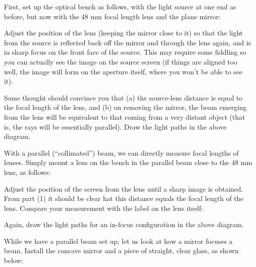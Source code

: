 \noindent First, set up the optical bench as follows, with the light
source at one end as before, but now with the 48 mm focal length lens
and the plane mirror:

\begin{figure*}[h]
\centerline{}
\caption{}
\end{figure*}

\noindent Adjust the position of the lens (keeping the mirror close to
it) so that the light from the source is reflected back off the mirror
and through the lens again, and is in sharp focus on the front face of
the source.  This may require some fiddling so you can actually see
the image on the source screen (if things are aligned too well, the
image will form on the aperture itself, where you won't be able to see
it).

\noindent Some thought should convince you that (a) the source-lens
distance is equal to the focal length of the lens, and (b) on removing
the mirror, the beam emerging from the lens will be equivalent to that
coming from a very distant object (that is, the rays will be
essentially parallel). 
Draw the light paths in the above diagram.

\clearpage

\noindent With a parallel (``collimated'') beam, we can directly
measure focal lengths of lenses.  Simply mount a lens on the bench in
the parallel beam close to the 48 mm lens, as follows:

\begin{figure*}[h]
\centerline{}
\caption{}
\end{figure*}


\noindent Adjust the position of the screen from the lens until a
sharp image is obtained.  From part (1) it should be clear hat this
distance equals the focal length of the lens. Compare your measurement
with the label on the lens itself:

\vspace{30pt}

\noindent Again, draw the light paths for an in-focus configuration in
the above diagram.

\noindent While we have a parallel beam set up, let us look at how a
mirror focuses a beam. Install the concave mirror and a piece of
straight, clear glass, as shown below:

\begin{figure*}[h]
\centerline{}
\caption{}
\end{figure*}

